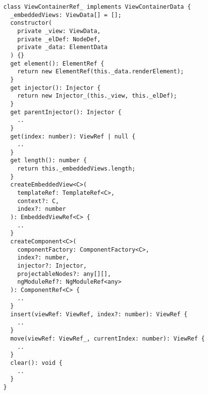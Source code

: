 \begin{verbatim}
class ViewContainerRef_ implements ViewContainerData {
  _embeddedViews: ViewData[] = [];
  constructor(
    private _view: ViewData,
    private _elDef: NodeDef,
    private _data: ElementData
  ) {}
  get element(): ElementRef {
    return new ElementRef(this._data.renderElement);
  }
  get injector(): Injector {
    return new Injector_(this._view, this._elDef);
  }
  get parentInjector(): Injector {
    ..
  }
  get(index: number): ViewRef | null {
    ..
  }
  get length(): number {
    return this._embeddedViews.length;
  }
  createEmbeddedView<C>(
    templateRef: TemplateRef<C>,
    context?: C,
    index?: number
  ): EmbeddedViewRef<C> {
    ..
  }
  createComponent<C>(
    componentFactory: ComponentFactory<C>,
    index?: number,
    injector?: Injector,
    projectableNodes?: any[][],
    ngModuleRef?: NgModuleRef<any>
  ): ComponentRef<C> {
    ..
  }
  insert(viewRef: ViewRef, index?: number): ViewRef {
    ..
  }
  move(viewRef: ViewRef_, currentIndex: number): ViewRef {
    ..
  }
  clear(): void {
    ..
  }
}
\end{verbatim}
